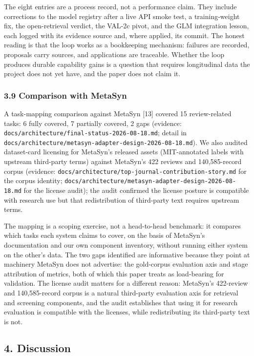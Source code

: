 \documentclass[
]{article}
\begin{document}
The eight entries are a process record, not a performance claim. They
include corrections to the model registry after a live API smoke test, a
training-weight fix, the open-retrieval verdict, the VAL-2c pivot, and
the GLM integration lesson, each logged with its evidence source and,
where applied, its commit. The honest reading is that the loop works as
a bookkeeping mechanism: failures are recorded, proposals carry sources,
and applications are traceable. Whether the loop produces durable
capability gains is a question that requires longitudinal data the
project does not yet have, and the paper does not claim it.

\subsubsection{3.9 Comparison with
MetaSyn}\label{comparison-with-metasyn}

A task-mapping comparison against MetaSyn {[}13{]} covered 15
review-related tasks: 6 fully covered, 7 partially covered, 2 gaps
(evidence: \texttt{docs/architecture/final-status-2026-08-18.md}; detail
in \texttt{docs/architecture/metasyn-adapter-design-2026-08-18.md}). We
also audited dataset-card licensing for MetaSyn's released assets
(MIT-annotated labels with upstream third-party terms) against MetaSyn's
422 reviews and 140,585-record corpus (evidence:
\texttt{docs/architecture/top-journal-contribution-story.md} for the
corpus identity;
\texttt{docs/architecture/metasyn-adapter-design-2026-08-18.md} for the
license audit); the audit confirmed the license posture is compatible
with research use but that redistribution of third-party text requires
upstream terms.

The mapping is a scoping exercise, not a head-to-head benchmark: it
compares which tasks each system claims to cover, on the basis of
MetaSyn's documentation and our own component inventory, without running
either system on the other's data. The two gaps identified are
informative because they point at machinery MetaSyn does not advertise:
the gold-corpus evaluation axis and stage attribution of metrics, both
of which this paper treats as load-bearing for validation. The license
audit matters for a different reason: MetaSyn's 422-review and
140,585-record corpus is a natural third-party evaluation axis for
retrieval and screening components, and the audit establishes that using
it for research evaluation is compatible with the licenses, while
redistributing its third-party text is not.

\subsection{4. Discussion}\label{discussion}
\end{document}
